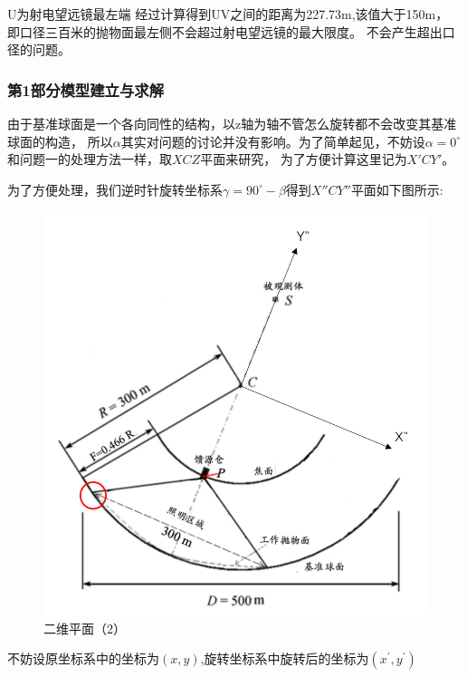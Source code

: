 \documentclass[withoutpreface,bwprint]{cumcmthesis} %
\begin{document}
U为射电望远镜最左端
经过计算得到UV之间的距离为227.73m,该值大于150m，
即口径三百米的抛物面最左侧不会超过射电望远镜的最大限度。
不会产生超出口径的问题。






\subsubsection{第1部分模型建立与求解}
由于基准球面是一个各向同性的结构，以z轴为轴不管怎么旋转都不会改变其基准球面的构造，
所以$\alpha$其实对问题的讨论并没有影响。为了简单起见，不妨设$\alpha = 0^\circ$和问题一的处理方法一样，取$XCZ$平面来研究，
为了方便计算这里记为$X'CY'$。



为了方便处理，我们逆时针旋转坐标系$\gamma = 90^\circ-\beta$得到$X''CY''$平面如下图所示:

\begin{figure}[H]
    \centering
    \includegraphics[scale=0.25]{images/pomian2.png}
    \caption{二维平面（2）}
\end{figure}




不妨设原坐标系中的坐标为$(x,y)$,旋转坐标系中旋转后的坐标为$(x^\prime,y^\prime)$
\end{document}
